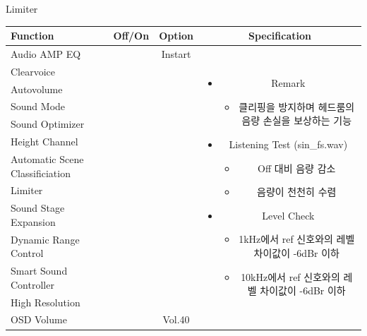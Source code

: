 \documentclass{beamer}
\begin{document}
\begin{frame}[t]{Limiter}
\begin{tiny}
\begin{tabular}{@{}lccc@{}}
\toprule
Function & Off/On & Option & Specification \\
\midrule
Audio AMP EQ & \color{black}{Off} & Instart &
\multirow{13}{60mm}{
\begin{itemize}
\item Remark
	\begin{itemize}
	\item 클리핑을 방지하며 헤드룸의 음량 손실을 보상하는 기능
	\end{itemize}
\item Listening Test (sin\_fs.wav)
	\begin{itemize}
	\item Off 대비 음량 감소
	\item 음량이 천천히 수렴
	\end{itemize}
\item Level Check
  \begin{itemize}
  \item 1kHz에서 ref 신호와의 레벨 차이값이 -6dBr 이하
  \item 10kHz에서 ref 신호와의 레벨 차이값이 -6dBr 이하
  \end{itemize}
\end{itemize}
} \\
Clearvoice & \color{black}{Off} & & \\
Autovolume & \color{black}{Off} & & \\
Sound Mode & \color{black}{Off} & & \\
Sound Optimizer & \color{black}{Off} & & \\
Height Channel & \color{black}{Off} & & \\
Automatic Scene Classificiation & \color{black}{Off} & & \\
Limiter & \color{blue}{On} & & \\
Sound Stage Expansion & \color{black}{Off} & & \\
Dynamic Range Control & \color{black}{Off} & & \\
Smart Sound Controller & \color{black}{Off} & & \\
High Resolution & \color{black}{Off} & & \\
OSD Volume & \color{blue}{On} & Vol.40 & \\
\midrule
\end{tabular}
\end{tiny}

\end{frame}
\end{document}
